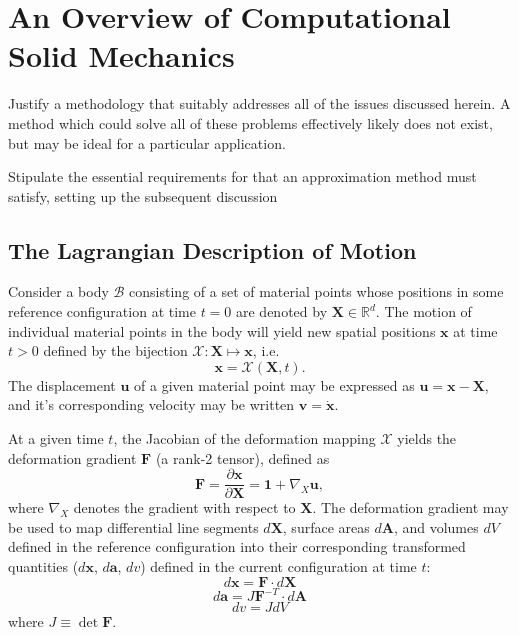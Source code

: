 \chapter{An Overview of Computational Solid Mechanics}
%
Justify a methodology that suitably addresses all of the issues discussed herein. A method which could solve all of these problems effectively likely does not exist, but may be ideal for a particular application.

Stipulate the essential requirements for that an approximation method must satisfy, setting up the subsequent discussion

\section{The Lagrangian Description of Motion}

Consider a body $\mathcal{B}$ consisting of a set of material points whose positions in some reference configuration at time $t = 0$ are denoted by $\mathbf{X} \in \mathbb{R}^d$. The motion of individual material points in the body will yield new spatial positions $\mathbf{x}$ at time $t > 0$ defined by the bijection $\mathcal{X} \colon \mathbf{X} \mapsto \mathbf{x}$, i.e.
\begin{equation}
  \mathbf{x} = \mathcal{X} (\mathbf{X}, t).
\end{equation}
The displacement $\mathbf{u}$ of a given material point may be expressed as $\mathbf{u} = \mathbf{x} - \mathbf{X}$, and it's corresponding velocity may be written $\mathbf{v} = \dot{\mathbf{x}}$.

At a given time $t$, the Jacobian of the deformation mapping $\mathcal{X}$ yields the deformation gradient $\mathbf{F}$ (a rank-2 tensor), defined as
\begin{equation}
  \mathbf{F} = \frac{\partial \mathbf{x}}{\partial \mathbf{X}} = \mathbf{1} + \nabla_X \mathbf{u},
\end{equation}
where $\nabla_X$ denotes the gradient with respect to $\mathbf{X}$. The deformation gradient may be used to map differential line segments $d \mathbf{X}$, surface areas $d \mathbf{A}$, and volumes $d V$ defined in the reference configuration into their corresponding transformed quantities ($d \mathbf{x}$, $d \mathbf{a}$, $dv$) defined in the current configuration at time $t$:
\begin{equation}
  d \mathbf{x} = \mathbf{F} \cdot d \mathbf{X}
\end{equation}
\begin{equation}
  d \mathbf{a} = J \mathbf{F}^{-T} \cdot d \mathbf{A}
\end{equation}
\begin{equation}
  d v = J d V
\end{equation}
where $J \equiv \det{\mathbf{F}}$.

